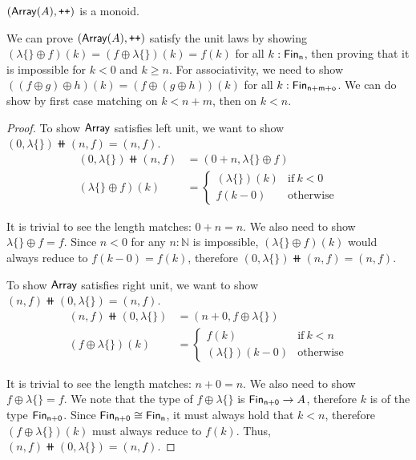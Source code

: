 \begin{propositionrep}
$(\operatorname{\mathsf{Array}}(A), \mathbin{\text{\ttfamily\upshape ++}})$ is a monoid.
\end{propositionrep}

\begin{proofsketch}
We can prove $(\operatorname{\mathsf{Array}}(A), \mathbin{\text{\ttfamily\upshape ++}})$ satisfy the unit laws by showing
$(\lambda\{\} \oplus f)(k) = (f \oplus \lambda\{\})(k) = f(k)$ for all $k : \Fin[n]$,
then proving that it is impossible for $k < 0$ and $k \geq n$. For associativity,
we need to show $((f \oplus g) \oplus h)(k) = (f \oplus (g \oplus h))(k)$ for all $k : \Fin[n+m+o]$.
We can do show by first case matching on $k < n+m$, then on $k < n$.
\end{proofsketch}

\begin{proof}
To show $\operatorname{\mathsf{Array}}$ satisfies left unit,
we want to show $(0, \lambda\{\}) \doubleplus (n, f) = (n, f)$.
\begin{align*}
    (0 , \lambda\{\}) \doubleplus (n , f) & = (0 + n , \lambda\{\} \oplus f) \\
    (\lambda\{\} \oplus f)(k) & = \begin{cases}
      (\lambda\{\})(k) & \text{if}\ k < 0 \\
      f(k - 0) & \text{otherwise}
    \end{cases}
\end{align*} 

It is trivial to see the length matches: $0 + n = n$. We also need to show $\lambda\{\} \oplus f = f$.
Since $n < 0$ for any $n : \mathbb{N}$ is impossible, $(\lambda\{\} \oplus f)(k)$ would always reduce to
$f(k - 0) = f(k)$, therefore $(0, \lambda\{\}) \doubleplus (n, f) = (n, f)$.

To show $\operatorname{\mathsf{Array}}$ satisfies right unit,
we want to show $(n, f) \doubleplus (0, \lambda\{\}) = (n, f)$.
\begin{align*}
    (n, f) \doubleplus (0 , \lambda\{\}) & = (n + 0, f \oplus \lambda\{\}) \\
    (f \oplus \lambda\{\})(k) & = \begin{cases}
      f(k) & \text{if}\ k < n \\
      (\lambda\{\})(k - 0) & \text{otherwise}
    \end{cases}
\end{align*} 

It is trivial to see the length matches: $n + 0 = n$. We also need to show $f \oplus \lambda\{\} = f$.
We note that the type of $f \oplus \lambda\{\}$ is $\Fin[n + 0] \to A$, therefore $k$ is of the type $\Fin[n + 0]$.
Since $\Fin[n+0] \cong \Fin[n]$, it must always hold that $k < n$, therefore $(f \oplus \lambda\{\})(k)$ must
always reduce to $f(k)$. Thus, $(n, f) \doubleplus (0, \lambda\{\}) = (n, f)$.


\end{proof}
